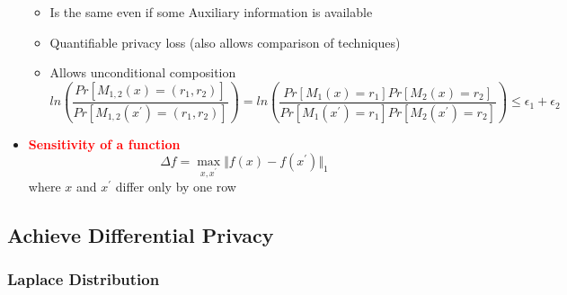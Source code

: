 \documentclass{article}
\newcommand{\redb}[1]{\textcolor{red}{\textbf{#1}}}
\begin{document}
\begin{itemize}
\begin{itemize}
            \item Is the same even if some Auxiliary information is available
            \item Quantifiable privacy loss (also allows comparison of techniques)
            \item Allows unconditional composition
                $$ln\left( \frac{Pr[M_{1,2}(x) = (r_1, r_2)]}{Pr[M_{1,2}(x^\prime) = (r_1, r_2)]} \right) = ln\left( \frac{Pr[M_1(x) = r_1]Pr[M_2(x) = r_2]}{Pr[M_1(x^\prime) = r_1]Pr[M_2(x^\prime) = r_2]} \right) \leq \epsilon_1+\epsilon_2$$
        \end{itemize}
    \item \redb{Sensitivity of a function}
        $$\Delta f = \max_{x, x^\prime} \Vert f(x)-f(x^\prime) \Vert_1$$
        where $x$ and $x^\prime$ differ only by one row
\end{itemize}

\subsection{Achieve Differential Privacy}

\subsubsection{Laplace Distribution}
\end{document}
